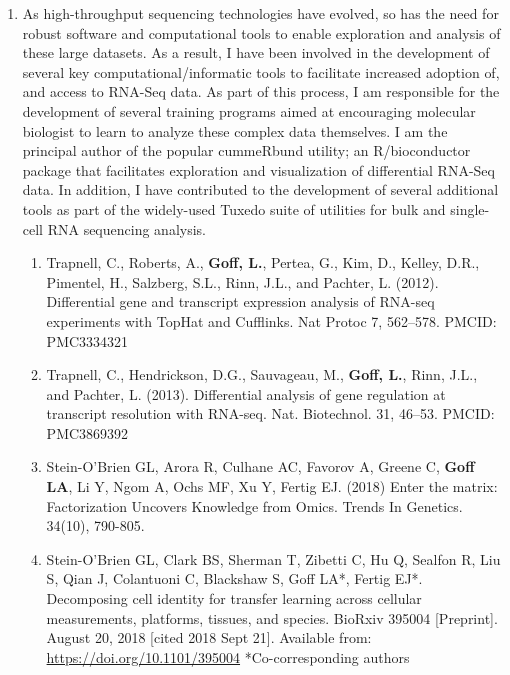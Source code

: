 \documentclass{nihbiosketch}
\begin{document}
\begin{enumerate}
\begin{enumerate}
\end{enumerate}

\item As high-throughput sequencing technologies have evolved, so has the need for robust software and computational tools to enable exploration and analysis of these large datasets. As a result, I have been involved in the development of several key computational/informatic tools to facilitate increased adoption of, and access to RNA-Seq data. As part of this process, I am responsible for the development of several training programs aimed at encouraging molecular biologist to learn to analyze these complex data themselves. I am the principal author of the popular cummeRbund utility; an R/bioconductor package that facilitates exploration and visualization of differential RNA-Seq data. In addition, I have contributed to the development of several additional tools as part of the widely-used Tuxedo suite of utilities for bulk and single-cell RNA sequencing analysis.

\begin{enumerate}   

\item	Trapnell, C., Roberts, A., \textbf{Goff, L.}, Pertea, G., Kim, D., Kelley, D.R., Pimentel, H., Salzberg, S.L., Rinn, J.L., and Pachter, L. (2012). Differential gene and transcript expression analysis of RNA-seq experiments with TopHat and Cufflinks. Nat Protoc 7, 562–578. PMCID: PMC3334321


\item	Trapnell, C., Hendrickson, D.G., Sauvageau, M., \textbf{Goff, L.}, Rinn, J.L., and Pachter, L. (2013). Differential analysis of gene regulation at transcript resolution with RNA-seq. Nat. Biotechnol. 31, 46–53. PMCID: PMC3869392

\item	Stein-O’Brien GL, Arora R, Culhane AC, Favorov A, Greene C, \textbf{Goff LA}, Li Y, Ngom A, Ochs MF, Xu Y, Fertig EJ. (2018) Enter the matrix: Factorization Uncovers Knowledge from Omics. Trends In Genetics. 34(10), 790-805. 

\item Stein-O’Brien GL, Clark BS, Sherman T, Zibetti C, Hu Q, Sealfon R, Liu S, Qian J, Colantuoni C, Blackshaw S, Goff LA*, Fertig EJ*. Decomposing cell identity for transfer learning across cellular measurements, platforms, tissues, and species. BioRxiv 395004 [Preprint]. August 20, 2018 [cited 2018 Sept 21]. Available from: \url{https://doi.org/10.1101/395004} *Co-corresponding authors


\end{enumerate}
\end{enumerate}
\end{document}
